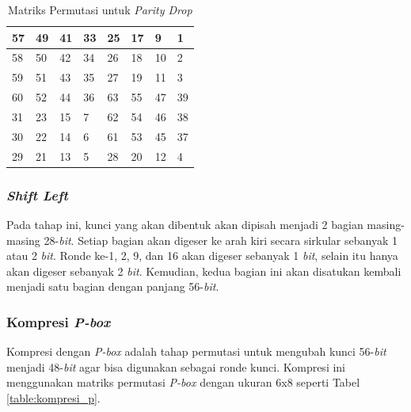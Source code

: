 \begin{table}
	\begin{center}
		\begin{tabular}{|l|l|l|l|l|l|l|l|}
				\hline
				57	&	49	&	41	&	33	&	25	&	17	&	9	&	1	\\ \hline
				58	&	50	&	42	&	34	&	26	&	18	&	10	&	2	\\ \hline
				59	&	51	&	43	&	35	&	27	&	19	&	11	&	3	\\ \hline
				60	&	52	&	44	&	36	&	63	&	55	&	47	&	39	\\ \hline
				31	&	23	&	15	&	7	&	62	&	54	&	46	&	38	\\ \hline
				30	&	22	&	14	&	6	&	61	&	53	&	45	&	37	\\ \hline
				29	&	21	&	13	&	5	&	28	&	20	&	12	&	4	\\ \hline
		\end{tabular}
	\end{center}
	\label{table:parity_drop}
	\caption{Matriks Permutasi untuk \textit{Parity Drop}}
\end{table}


\subsubsection{\textit{Shift Left}}
Pada tahap ini, kunci yang akan dibentuk akan dipisah menjadi 2 bagian masing-masing 28-\textit{bit}. Setiap bagian akan digeser ke arah kiri secara sirkular sebanyak 1 atau 2 \textit{bit}. Ronde ke-1, 2, 9, dan 16 akan digeser sebanyak 1 \textit{bit}, selain itu hanya akan digeser sebanyak 2 \textit{bit}. Kemudian, kedua bagian ini akan disatukan kembali menjadi satu bagian dengan panjang 56-\textit{bit}.

\subsubsection{Kompresi \textit{P-box}}
\label{sssec:kompresi_Pbox}
Kompresi dengan \textit{P-box} adalah tahap permutasi untuk mengubah kunci 56-\textit{bit} menjadi 48-\textit{bit} agar bisa digunakan sebagai ronde kunci. Kompresi ini menggunakan matriks permutasi \textit{P-box} dengan ukuran 6x8 seperti Tabel \ref{table:kompresi_p}.

